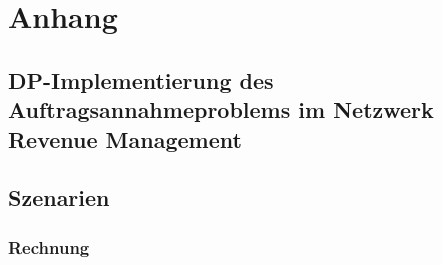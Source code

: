 \chapter*{Anhang}

\section{DP-Implementierung des Auftragsannahmeproblems im Netzwerk Revenue Management}\label{CodeA}





\section{Szenarien}

\subsection{Rechnung}

